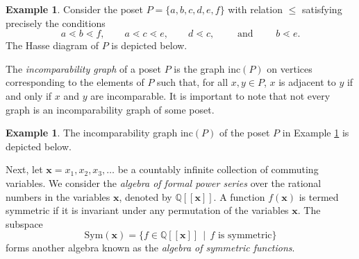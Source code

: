 \documentclass[12pt]{amsart}
\newcommand{\Q}{\mathbb{Q}}
\newcommand{\andd}{\qquad\text{ and }\qquad}
\numberwithin{equation}{section}
\theoremstyle{plain}
\theoremstyle{definition}
\newtheorem{example}[equation]{Example}
\theoremstyle{remark}
\begin{document}
\begin{example}
\label{ex:hasse}
Consider the poset $P=\{a,b,c,d,e,f\}$ with relation $\le$ satisfying precisely the conditions
\[
a\lessdot b\lessdot f,\qquad a\lessdot c \lessdot e,\qquad d\lessdot c,\andd b\lessdot e.
\]
The Hasse diagram of $P$ is depicted below.
\begin{figure}[H]
    \centering
\end{figure}
\end{example}


    The \textit{incomparability graph} of a poset $P$ is the graph $\text{inc}(P)$ on vertices corresponding to the elements of $P$ such that, for all $x,y\in P$, $x$ is adjacent to $y$ if and only if $x$ and $y$ are incomparable. It is important to note that not every graph is an incomparability graph of some poset.


\begin{example}
\label{ex:inc_graph}
The incomparability graph $\text{inc}(P)$ of the poset $P$ in Example \ref{ex:hasse} is depicted below.
\begin{figure}[H]
    \centering
\end{figure}
\end{example}



Next, let $\mathbf{x} = {x_1, x_2, x_3, \dots}$ be a countably infinite collection of commuting variables. We consider the \textit{algebra of formal power series} over the rational numbers in the variables $\mathbf{x}$, denoted by $\Q[[\mathbf{x}]]$. A function $f(\mathbf{x})$ is termed symmetric if it is invariant under any permutation of the variables $\mathbf{x}$. The subspace
\[
\text{Sym}(\mathbf{x})=\{f\in \Q[[\mathbf{x}]]\,\mid\,f\text{ is symmetric}\}
\]
forms another algebra known as the \textit{algebra of symmetric functions}.
\end{document}
